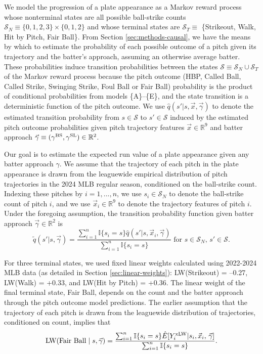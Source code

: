 \documentclass{article}
\begin{document}
      We model the progression of a plate appearance as a Markov reward process whose nonterminal states are all possible ball-strike counts $\mathcal{S}_N \equiv \{0, 1, 2, 3\} \times \{0, 1, 2\}$ and whose terminal states are $\mathcal{S}_T \equiv$ \{Strikeout, Walk, Hit by Pitch, Fair Ball\}. From Section \ref{sec:methods-causal}, we have the means by which to estimate the probability of each possible outcome of a pitch given its trajectory and the batter's approach, assuming an otherwise average batter. These probabilities induce transition probabilities between the states $\mathcal{S} \equiv \mathcal{S}_N \cup \mathcal{S}_T$ of the Markov reward process because the pitch outcome (HBP, Called Ball, Called Strike, Swinging Strike, Foul Ball or Fair Ball) probability is the product of conditional probabilities from models \{A\}--\{E\}, and the state transition is a deterministic function of the pitch outcome. We use $\hat q(s' | s, \vec x, \vec \gamma)$ to denote the estimated transition probability from $s \in \mathcal{S}$ to $s' \in \mathcal{S}$ induced by the estimated pitch outcome probabilities given pitch trajectory features $\vec x \in \mathbb{R}^9$ and batter approach $\vec\gamma \equiv (\gamma^{\mbox{\scriptsize BS}}, \gamma^{\mbox{\scriptsize SL}}) \in \mathbb{R}^2$.

      Our goal is to estimate the expected run value of a plate appearance given any batter approach $\gamma$. We assume that the trajectory of each pitch in the plate appearance is drawn from the leaguewide empirical distribution of pitch trajectories in the 2024 MLB regular season, conditioned on the ball-strike count. Indexing these pitches by $i = 1, ..., n$, we use $s_i \in \mathcal{S}_N$ to denote the ball-strike count of pitch $i$, and we use $\vec x_i \in \mathbb{R}^9$ to denote the trajectory features of pitch $i$. Under the foregoing assumption, the transition probability function given batter approach $\vec\gamma \in \mathbb{R}^2$ is
      \begin{equation*}
        \tilde q(s' | s, \vec\gamma) = \frac{
          \sum_{i = 1}^n \mathbb{I}\{s_i = s\} \hat q(s' | s, \vec x_i, \vec\gamma)
        }{
          \sum_{i = 1}^n \mathbb{I}\{s_i = s\}
        } \mbox{ for }s \in \mathcal{S}_N,\, s' \in \mathcal{S}.
      \end{equation*}

      For three terminal states, we used fixed linear weights calculated using 2022-2024 MLB data (as detailed in Section \ref{sec:linear-weights}): LW(Strikeout) = --0.27, LW(Walk) = +0.33, and LW(Hit by Pitch) = +0.36. The linear weight of the final terminal state, Fair Ball, depends on the count and the batter approach through the pitch outcome model predictions. The earlier assumption that the trajectory of each pitch is drawn from the leaguewide distribution of trajectories, conditioned on count, implies that
      \begin{equation*}
        \mbox{LW}(\mbox{Fair Ball} \mid s, \vec\gamma) = \frac{
          \sum_{i = 1}^n \mathbb{I}\{s_i = s\} \hat E[Y_i^{\mbox{\scriptsize xLW}} | s_i, \vec x_i,\, \vec\gamma]
        }{
          \sum_{i = 1}^n \mathbb{I}\{s_i = s\}
        }.
      \end{equation*}
\end{document}
